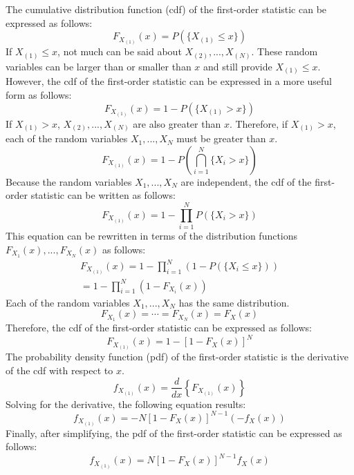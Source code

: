 \documentclass[conference]{IEEEtran}
\begin{document}
The cumulative distribution function (cdf) of the first-order statistic can be expressed as follows:
\begin{equation}
F_{X_{(1)}}(x) = P(\{X_{(1)} \leq x\})
\end{equation}
If $X_{(1)} \leq x$, not much can be said about $X_{(2)},...,X_{(N)}$. These random variables can be larger than or smaller than $x$ and still provide $X_{(1)} \leq x$. However, the cdf of the first-order statistic can be expressed in a more useful form as follows:
\begin{equation}
F_{X_{(1)}}(x) = 1 - P(\{X_{(1)} > x\})
\end{equation}
If $X_{(1)} > x$, $X_{(2)},...,X_{(N)}$ are also greater than $x$. Therefore, if  $X_{(1)} > x$, each of the random variables $X_1,...,X_N$ must be greater than $x$. 
\begin{equation}
F_{X_{(1)}}(x) = 1 - P\left(\bigcap_{i=1}^N\{X_i > x\}\right)
\end{equation}
Because the random variables $X_1,...,X_N$ are independent, the cdf of the first-order statistic can be written as follows:
\begin{equation}
F_{X_{(1)}}(x) = 1 - \prod_{i=1}^N P(\{X_i > x\})
\end{equation}
This equation can be rewritten in terms of the distribution functions $F_{X_1}(x),...,F_{X_N}(x)$ as follows:
\begin{equation}
\begin{gathered}
F_{X_{(1)}}(x) = 1 - \prod_{i=1}^N (1-P(\{X_i \leq x\}))\\
= 1 - \prod_{i=1}^N (1-F_{X_i}(x))
\end{gathered}
\end{equation}
Each of the random variables $X_1,...,X_N$ has the same distribution.
\begin{equation}
F_{X_1}(x)=\cdots=F_{X_N}(x)=F_X(x)
\end{equation}
Therefore, the cdf of the first-order statistic can be expressed as follows: 
\begin{equation}
F_{X_{(1)}}(x) = 1 - [1 - F_X(x)]^N
\end{equation}
The probability density function (pdf) of the first-order statistic is the derivative of the cdf with respect to $x$.
\begin{equation}
f_{X_{(1)}}(x) = \frac{d}{dx}\left\{F_{X_{(1)}}(x)\right\}
\end{equation}
Solving for the derivative, the following equation results:
\begin{equation}
f_{X_{(1)}}(x) = -N[1 - F_X(x)]^{N-1}(-f_X(x))
\end{equation}
Finally, after simplifying, the pdf of the first-order statistic can be expressed as follows:
\begin{equation}
f_{X_{(1)}}(x) = N[1 - F_X(x)]^{N-1}f_X(x)
\end{equation}
\end{document}
